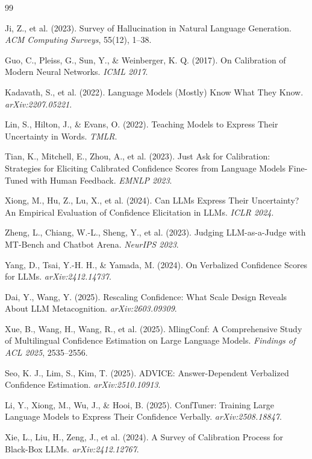 \documentclass[11pt,a4paper,oneside]{article}
\begin{document}
\begin{thebibliography}{99}

 Ji, Z., et al. (2023). Survey of Hallucination in Natural Language Generation. \textit{ACM Computing Surveys}, 55(12), 1--38.

 Guo, C., Pleiss, G., Sun, Y., \& Weinberger, K. Q. (2017). On Calibration of Modern Neural Networks. \textit{ICML 2017}.

 Kadavath, S., et al. (2022). Language Models (Mostly) Know What They Know. \textit{arXiv:2207.05221}.

 Lin, S., Hilton, J., \& Evans, O. (2022). Teaching Models to Express Their Uncertainty in Words. \textit{TMLR}.

 Tian, K., Mitchell, E., Zhou, A., et al. (2023). Just Ask for Calibration: Strategies for Eliciting Calibrated Confidence Scores from Language Models Fine-Tuned with Human Feedback. \textit{EMNLP 2023}.

 Xiong, M., Hu, Z., Lu, X., et al. (2024). Can LLMs Express Their Uncertainty? An Empirical Evaluation of Confidence Elicitation in LLMs. \textit{ICLR 2024}.

 Zheng, L., Chiang, W.-L., Sheng, Y., et al. (2023). Judging LLM-as-a-Judge with MT-Bench and Chatbot Arena. \textit{NeurIPS 2023}.

 Yang, D., Tsai, Y.-H. H., \& Yamada, M. (2024). On Verbalized Confidence Scores for LLMs. \textit{arXiv:2412.14737}.

 Dai, Y., Wang, Y. (2025). Rescaling Confidence: What Scale Design Reveals About LLM Metacognition. \textit{arXiv:2603.09309}.

 Xue, B., Wang, H., Wang, R., et al. (2025). MlingConf: A Comprehensive Study of Multilingual Confidence Estimation on Large Language Models. \textit{Findings of ACL 2025}, 2535--2556.

 Seo, K. J., Lim, S., Kim, T. (2025). ADVICE: Answer-Dependent Verbalized Confidence Estimation. \textit{arXiv:2510.10913}.

 Li, Y., Xiong, M., Wu, J., \& Hooi, B. (2025). ConfTuner: Training Large Language Models to Express Their Confidence Verbally. \textit{arXiv:2508.18847}.

 Xie, L., Liu, H., Zeng, J., et al. (2024). A Survey of Calibration Process for Black-Box LLMs. \textit{arXiv:2412.12767}.


\end{thebibliography}
\end{document}
